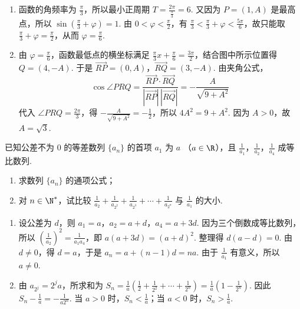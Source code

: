 \begin{solution}
\begin{enumerate}
\item 函数的角频率为 \(\frac\pi3\)，所以最小正周期 \(T=\frac{2\pi}{\frac{\pi}{3}}=6\). 又因为 \(P=(1,A)\) 是最高点，所以 \(\sin\left(\frac\pi3+\varphi\right)=1\). 由 \(0<\varphi<\frac\pi2\)，有 \(\frac\pi3<\frac\pi3+\varphi<\frac{5\pi}6\)，故只能取 \(\frac\pi3+\varphi=\frac\pi2\)，从而 \(\varphi=\frac\pi6\).
\item 由 \(\varphi=\frac\pi6\)，函数最低点的横坐标满足 \(\frac\pi3x+\frac\pi6=\frac{3\pi}2\)，结合图中所示位置得 \(Q=(4,-A)\). 于是 \(\overrightarrow{RP}=(0,A)\)，\(\overrightarrow{RQ}=(3,-A)\). 由夹角公式，
\[
\cos\angle PRQ=\frac{\overrightarrow{RP}\cdot\overrightarrow{RQ}}{|\overrightarrow{RP}|\,|\overrightarrow{RQ}|}=-\frac{A}{\sqrt{9+A^2}}
\]
代入 \(\angle PRQ=\frac{2\pi}{3}\)，得 \(-\frac{A}{\sqrt{9+A^2}}=-\frac12\)，所以 \(4A^2=9+A^2\). 因为 \(A>0\)，故 \(A=\sqrt3\).
\end{enumerate}
\end{solution}

\begin{problem}
已知公差不为 0 的等差数列 \(\{a_{n}\}\) 的首项 \(a_{1}\) 为 \(a\) （\(a \in \R\)），且 \(\frac{1}{a_1}\)，\(\frac{1}{a_2}\)，\(\frac{1}{a_4}\) 成等比数列.
\begin{enumerate}
\item 求数列 \( \{a_{n}\} \) 的通项公式；
\item 对 \(n \in \N^*\)，试比较 \(\frac{1}{a_2} + \frac{1}{a_{2^2}} + \frac{1}{a_{2^3}} + \cdots + \frac{1}{a_{2^n}}\) 与 \(\frac{1}{a_1}\) 的大小.
\end{enumerate}
\end{problem}

\begin{solution}
\begin{enumerate}
\item 设公差为 \(d\)，则 \(a_1=a\)，\(a_2=a+d\)，\(a_4=a+3d\). 因为三个倒数成等比数列，所以 \(\left(\frac1{a_2}\right)^2=\frac1{a_1a_4}\)，即 \(a(a+3d)=(a+d)^2\). 整理得 \(d(a-d)=0\). 由 \(d\neq0\)，得 \(d=a\)，于是 \(a_n=a+(n-1)d=na\). 由于 \(\frac1{a_1}\) 有意义，所以 \(a\neq0\).
\item 由 \(a_{2^j}=2^j a\)，所求和为 \(S_n=\frac1a\left(\frac12+\frac1{2^2}+\cdots+\frac1{2^n}\right)=\frac1a\left(1-\frac1{2^n}\right)\). 因此 \(S_n-\frac1a=-\frac1{a2^n}\). 当 \(a>0\) 时，\(S_n<\frac1a\)；当 \(a<0\) 时，\(S_n>\frac1a\).
\end{enumerate}
\end{solution}

